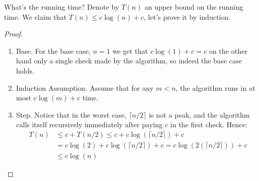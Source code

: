 What's the running time? Denote by $T\left( n \right)$ an upper bound on the running time. We claim that $T(n) \le c \log (n) + c$, let's prove it by induction.
\begin{proof}
     
\begin{enumerate}
  \item Base. For the base case, $n=1$ we get that $c \log(1) + c =  c$ on the other hand only a single check made by the algorithm, so indeed the base case holds.
  \item Induction Assumption. Assume that for any $m < n$, the algorithm runs in at most $c \log(m) + c$ time.
  \item Step. Notice that in the worst case, $\lceil n/2 \rceil$ is not a peak, and the algorithm calls itself recursively immediately after paying $c$ in the first check. Hence: \begin{equation*}
      \begin{split}    
    T\left(n\right) & \le c + T\left(n/2\right) \le c + c \log\left( \lceil n/2 \rceil \right) + c\\
  & = c \log (2) +  c \log\left( \lceil n/2 \rceil  \right) + c = c \log\left(2 \left(\lceil n/2 \rceil \right) \right) + c\\
  & \le c \log \left( n  \right)    
      \end{split}
    \end{equation*}
\end{enumerate}
\end{proof}




